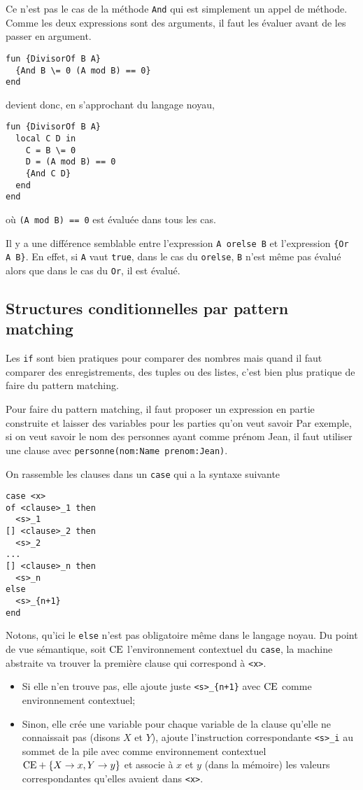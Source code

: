 Ce n'est pas le cas de la méthode \lstinline|And| qui est simplement
un appel de méthode.
Comme les deux expressions sont des arguments,
il faut les évaluer avant de les passer en argument.
\begin{lstlisting}
fun {DivisorOf B A}
  {And B \= 0 (A mod B) == 0}
end
\end{lstlisting}
devient donc, en s'approchant du langage noyau,
\begin{lstlisting}
fun {DivisorOf B A}
  local C D in
    C = B \= 0
    D = (A mod B) == 0
    {And C D}
  end
end
\end{lstlisting}
où \lstinline|(A mod B) == 0| est évaluée dans tous les cas.

Il y a une différence semblable entre l'expression
\lstinline|A orelse B| et l'expression \lstinline|{Or A B}|.
En effet, si \lstinline|A| vaut \lstinline|true|, dans le cas
du \lstinline|orelse|, \lstinline|B| n'est même pas évalué
alors que dans le cas du \lstinline|Or|, il est évalué.

\subsection{Structures conditionnelles par pattern matching}
Les \lstinline|if| sont bien pratiques pour comparer des nombres
mais quand il faut comparer des enregistrements, des tuples ou des listes,
c'est bien plus pratique de faire du pattern matching.

Pour faire du pattern matching,
il faut proposer un expression en partie construite et laisser
des variables pour les parties qu'on veut savoir
Par exemple, si on veut savoir le nom des personnes ayant comme prénom Jean,
il faut utiliser une clause avec \lstinline|personne(nom:Name prenom:Jean)|.

On rassemble les clauses dans un \lstinline|case| qui a la syntaxe suivante
\begin{lstlisting}
case <x>
of <clause>_1 then
  <s>_1
[] <clause>_2 then
  <s>_2
...
[] <clause>_n then
  <s>_n
else
  <s>_{n+1}
end
\end{lstlisting}
Notons, qu'ici le \lstinline|else| n'est pas obligatoire même dans
le langage noyau.
Du point de vue sémantique, soit $\mathrm{CE}$ l'environnement contextuel
du \lstinline|case|, la machine abstraite va trouver
la première clause qui correspond à \lstinline|<x>|.
\begin{itemize}
  \item Si elle n'en
    trouve pas, elle ajoute juste \lstinline|<s>_{n+1}| avec $\mathrm{CE}{}$ comme
    environnement contextuel;
  \item Sinon, elle crée une variable pour chaque variable
    de la clause qu'elle ne connaissait pas (disons $X$ et $Y$), ajoute l'instruction correspondante \lstinline|<s>_i| au sommet
    de la pile avec comme environnement contextuel
    $\mathrm{CE} + \{X\to x, Y\to y\}$ et associe à $x$ et $y$ (dans la mémoire) les valeurs correspondantes qu'elles avaient dans \lstinline|<x>|.
\end{itemize}


